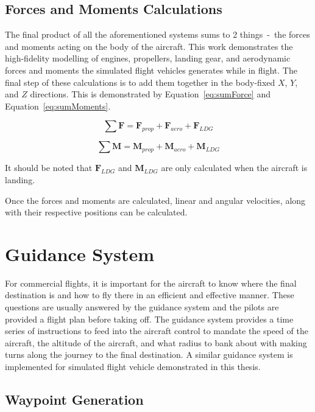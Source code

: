 \documentclass[12pt]{report}
\begin{document}
\clearpage
\subsection{Forces and Moments Calculations}
The final product of all the aforementioned systems sums to 2 things~-~the forces and moments acting on the body of the aircraft. This work demonstrates the high-fidelity modelling of engines, propellers, landing gear, and aerodynamic forces and moments the simulated flight vehicles generates while in flight. The final step of these calculations is to add them together in the body-fixed \(X\), \(Y\), and \(Z\) directions. This is demonstrated by Equation~\ref{eq:sumForce} and Equation~\ref{eq:sumMoments}.

\begin{equation}
  \sum \mathbf{F} = \mathbf{F}_{prop} + \mathbf{F}_{aero} + \mathbf{F}_{LDG}
  \label{eq:sumForce}
\end{equation}

\begin{equation}
  \sum \mathbf{M} = \mathbf{M}_{prop} + \mathbf{M}_{aero} + \mathbf{M}_{LDG}
  \label{eq:sumMoments}
\end{equation}

It should be noted that \(\mathbf{F}_{LDG}\) and \(\mathbf{M}_{LDG}\) are only calculated when the aircraft is landing.

Once the forces and moments are calculated, linear and angular velocities, along with their respective positions can be calculated.
\clearpage

\section{Guidance System}
For commercial flights, it is important for the aircraft to know where the final destination is and how to fly there in an efficient and effective manner. These questions are usually answered by the guidance system and the pilots are provided a flight plan before taking off. The guidance system provides a time series of instructions to feed into the aircraft control to mandate the speed of the aircraft, the altitude of the aircraft, and what radius to bank about with making turns along the journey to the final destination. A similar guidance system is implemented for simulated flight vehicle demonstrated in this thesis.

\subsection{Waypoint Generation}
\end{document}
